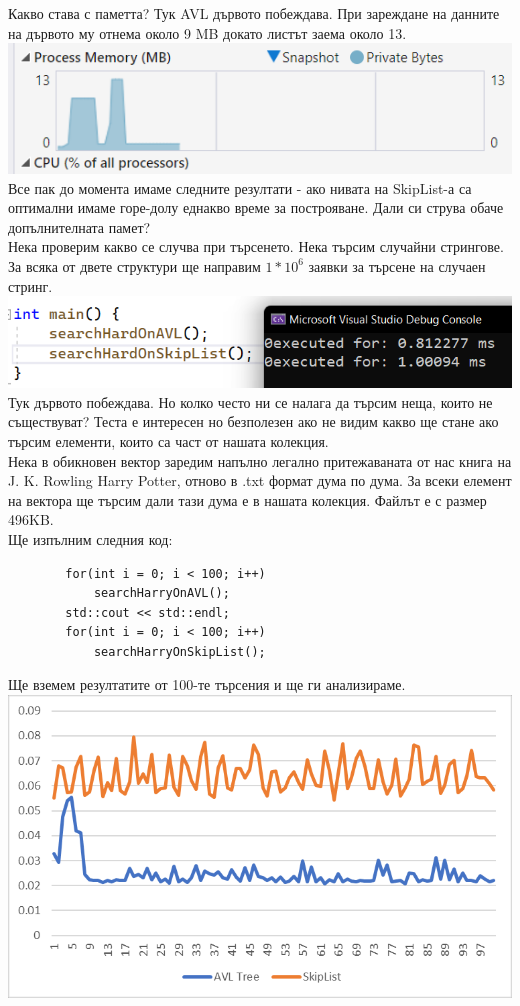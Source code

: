 \documentclass[a4paper,12pt,fleqn]{article}
\begin{document}
	Какво става с паметта? Тук AVL дървото побеждава. При зареждане на данните на дървото му отнема около 9 MB докато листът заема около 13.\\
	\includegraphics[scale=0.4]{mem-consume.png}\\
	Все пак до момента имаме следните резултати - ако нивата на SkipList-а са оптимални имаме горе-долу еднакво време за построяване. Дали си струва обаче допълнителната памет?\\
	Нека проверим какво се случва при търсенето. Нека търсим случайни стрингове. За всяка от двете структури ще направим $1*10^6$ заявки за търсене на случаен стринг.\\
	\includegraphics[scale=0.4]{search.png}\\
	Тук дървото побеждава. Но колко често ни се налага да търсим неща, които не съществуват? Теста е интересен но безполезен ако не видим какво ще стане ако търсим елементи, които са част от нашата колекция.\\
	Нека в обикновен вектор заредим напълно легално притежаваната от нас книга на J. K. Rowling Harry Potter, отново в .txt формат дума по дума. За всеки елемент на вектора ще търсим дали тази дума е в нашата колекция. Файлът е с размер 496KB.\\
	Ще изпълним следния код:\\
	\begin{lstlisting}
		for(int i = 0; i < 100; i++)
			searchHarryOnAVL();
		std::cout << std::endl;
		for(int i = 0; i < 100; i++)
			searchHarryOnSkipList();
	\end{lstlisting}
	Ще вземем резултатите от 100-те търсения и ще ги анализираме.\\
	\includegraphics[scale=0.5]{searches.png}\\
\end{document}
